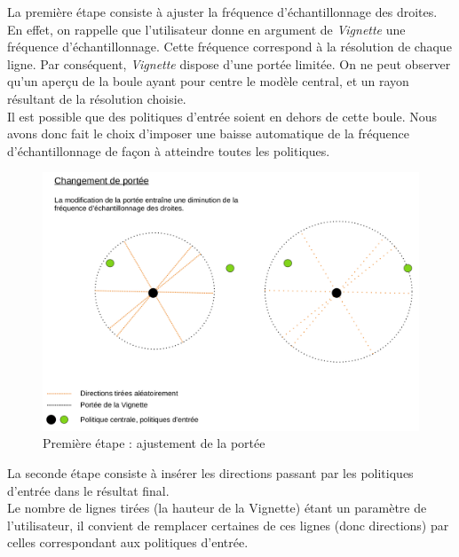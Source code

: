 \documentclass[12pt]{article}
\begin{document}
La première étape consiste à ajuster la fréquence d'échantillonnage des droites. \\

En effet, on rappelle que l'utilisateur donne en argument de \emph{Vignette} une fréquence d'échantillonnage. Cette fréquence correspond à la résolution de chaque ligne. Par conséquent, \emph{Vignette} dispose d'une portée limitée. On ne peut observer qu'un aperçu de la boule ayant pour centre le modèle central, et un rayon résultant de la résolution choisie. \\

Il est possible que des politiques d'entrée soient en dehors de cette boule. Nous avons donc fait le choix d'imposer une baisse automatique de la fréquence d'échantillonnage de façon à atteindre toutes les politiques. \\

\newpage
 
\begin{figure}[htp]
    \centering
    \includegraphics[width=18cm]{Images/vignette_portee1}
    \caption{Première étape : ajustement de la portée}
    \label{fig:vignettePortee}
\end{figure}

La seconde étape consiste à insérer les directions passant par les politiques d'entrée dans le résultat final. \\

Le nombre de lignes tirées (la hauteur de la Vignette) étant un paramètre de l'utilisateur, il convient de remplacer certaines de ces lignes (donc directions) par celles correspondant aux politiques d'entrée. \\
\end{document}

